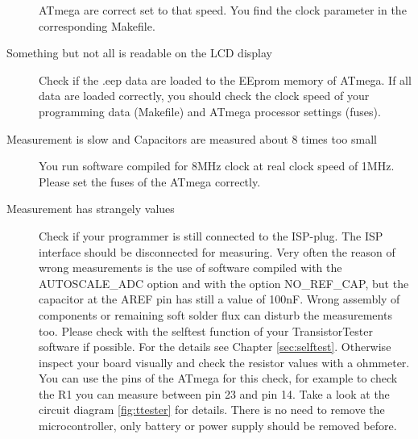 \begin{description}
ATmega are correct set to that speed. You find the clock parameter in the corresponding
Makefile.
\item[Something but not all is readable on the LCD display]
Check if the .eep data are loaded to the EEprom memory of ATmega.
If all data are loaded correctly, you should check the clock speed of your
programming data (Makefile) and ATmega processor settings (fuses).
\item[Measurement is slow and Capacitors are measured about 8 times too small]
You run software compiled for 8MHz clock at real clock speed of 1MHz.
Please set the fuses of the ATmega correctly.
\item[Measurement has strangely values]
Check if your programmer is still connected to the ISP-plug.
The ISP interface should be disconnected for measuring.
Very often the reason of wrong measurements is the use of software compiled with
the AUTOSCALE\_ADC option and with the option NO\_REF\_CAP, but the capacitor
at the AREF pin has still a value of 100nF.
Wrong assembly of components or remaining soft solder flux can disturb the 
measurements too. Please check with the selftest function of your TransistorTester software
if possible. For the details see Chapter \ref{sec:selftest}.
Otherwise inspect your board visually and check the resistor values
with a ohmmeter. You can use the pins of the ATmega for this check, for example
to check the R1 you can measure between pin 23 and pin 14. Take a look at the
circuit diagram \ref{fig:ttester} for details. There is no need to
remove the microcontroller, only battery or power supply should be removed before.


\end{description}
